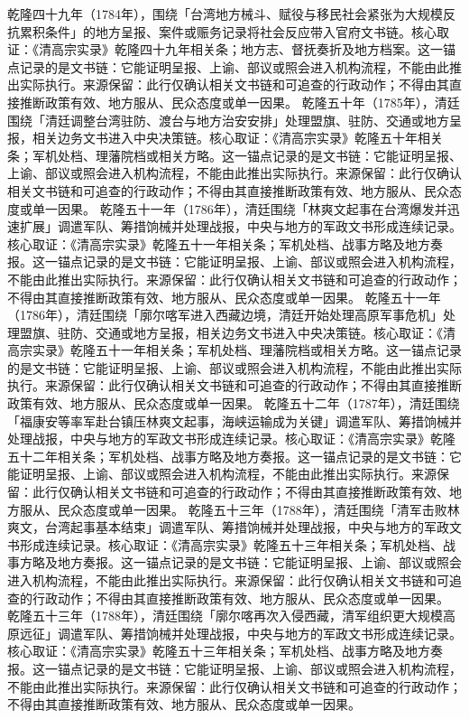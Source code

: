 乾隆四十九年（1784年），围绕「台湾地方械斗、赋役与移民社会紧张为大规模反抗累积条件」的地方呈报、案件或赈务记录将社会反应带入官府文书链。核心取证：《清高宗实录》乾隆四十九年相关条；地方志、督抚奏折及地方档案。这一锚点记录的是文书链：它能证明呈报、上谕、部议或照会进入机构流程，不能由此推出实际执行。来源保留：此行仅确认相关文书链和可追查的行政动作；不得由其直接推断政策有效、地方服从、民众态度或单一因果。
乾隆五十年（1785年），清廷围绕「清廷调整台湾驻防、渡台与地方治安安排」处理盟旗、驻防、交通或地方呈报，相关边务文书进入中央决策链。核心取证：《清高宗实录》乾隆五十年相关条；军机处档、理藩院档或相关方略。这一锚点记录的是文书链：它能证明呈报、上谕、部议或照会进入机构流程，不能由此推出实际执行。来源保留：此行仅确认相关文书链和可追查的行政动作；不得由其直接推断政策有效、地方服从、民众态度或单一因果。
乾隆五十一年（1786年），清廷围绕「林爽文起事在台湾爆发并迅速扩展」调遣军队、筹措饷械并处理战报，中央与地方的军政文书形成连续记录。核心取证：《清高宗实录》乾隆五十一年相关条；军机处档、战事方略及地方奏报。这一锚点记录的是文书链：它能证明呈报、上谕、部议或照会进入机构流程，不能由此推出实际执行。来源保留：此行仅确认相关文书链和可追查的行政动作；不得由其直接推断政策有效、地方服从、民众态度或单一因果。
乾隆五十一年（1786年），清廷围绕「廓尔喀军进入西藏边境，清廷开始处理高原军事危机」处理盟旗、驻防、交通或地方呈报，相关边务文书进入中央决策链。核心取证：《清高宗实录》乾隆五十一年相关条；军机处档、理藩院档或相关方略。这一锚点记录的是文书链：它能证明呈报、上谕、部议或照会进入机构流程，不能由此推出实际执行。来源保留：此行仅确认相关文书链和可追查的行政动作；不得由其直接推断政策有效、地方服从、民众态度或单一因果。
乾隆五十二年（1787年），清廷围绕「福康安等率军赴台镇压林爽文起事，海峡运输成为关键」调遣军队、筹措饷械并处理战报，中央与地方的军政文书形成连续记录。核心取证：《清高宗实录》乾隆五十二年相关条；军机处档、战事方略及地方奏报。这一锚点记录的是文书链：它能证明呈报、上谕、部议或照会进入机构流程，不能由此推出实际执行。来源保留：此行仅确认相关文书链和可追查的行政动作；不得由其直接推断政策有效、地方服从、民众态度或单一因果。
乾隆五十三年（1788年），清廷围绕「清军击败林爽文，台湾起事基本结束」调遣军队、筹措饷械并处理战报，中央与地方的军政文书形成连续记录。核心取证：《清高宗实录》乾隆五十三年相关条；军机处档、战事方略及地方奏报。这一锚点记录的是文书链：它能证明呈报、上谕、部议或照会进入机构流程，不能由此推出实际执行。来源保留：此行仅确认相关文书链和可追查的行政动作；不得由其直接推断政策有效、地方服从、民众态度或单一因果。
乾隆五十三年（1788年），清廷围绕「廓尔喀再次入侵西藏，清军组织更大规模高原远征」调遣军队、筹措饷械并处理战报，中央与地方的军政文书形成连续记录。核心取证：《清高宗实录》乾隆五十三年相关条；军机处档、战事方略及地方奏报。这一锚点记录的是文书链：它能证明呈报、上谕、部议或照会进入机构流程，不能由此推出实际执行。来源保留：此行仅确认相关文书链和可追查的行政动作；不得由其直接推断政策有效、地方服从、民众态度或单一因果。
